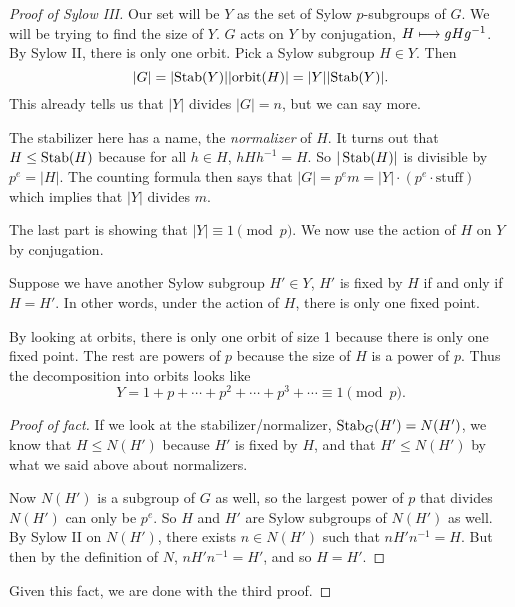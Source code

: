 \begin{proof}[Proof of Sylow III]
    Our set will be $Y$ as the set of Sylow $p$-subgroups of $G$. 
    We will be trying to find the size of $Y$.
    $G$ acts on $Y$ by conjugation, $H \longmapsto gHg^{-1}$.
    By Sylow II, there is only one orbit. 
    Pick a Sylow subgroup $H \in Y$.
    Then $$|G| = \lvert\operatorname{Stab}(Y)\rvert \lvert\text{orbit}(H)\rvert = |Y| \lvert\operatorname{Stab}(Y)\rvert.$$
    This already tells us that $|Y|$ divides $|G| = n$, but we can say more.

    The stabilizer here has a name, the \emph{normalizer} of $H$. 
    It turns out that $H \leq  \operatorname{Stab}(H)$ because for all $h \in H$, $hHh^{-1} = H$. 
    So $|\operatorname{Stab}(H)|$ is divisible by $p^e = |H|$. 
    The counting formula then says that $|G| = p^em = |Y| \cdot (p^e \cdot \text{stuff})$ which implies that $|Y|$ divides $m$.

    The last part is showing that $|Y| \equiv 1 \pmod{p}$. 
    We now use the action of $H$ on $Y$ by conjugation. 
    \begin{fact}
        Suppose we have another Sylow subgroup $H' \in Y$, $H'$ is fixed by $H$ if and only if $H = H'$. 
        In other words, under the action of $H$, there is only one fixed point.
    \end{fact}
    By looking at orbits, there is only one orbit of size 1 because there is only one fixed point. 
    The rest are powers of $p$ because the size of $H$ is a power of $p$.
    Thus the decomposition into orbits looks like \[ Y = 1 + p + \cdots + p^2 + \cdots + p^3 + \cdots \equiv 1 \pmod{p}.\]

    \begin{proof}[Proof of fact]
        If we look at the stabilizer/normalizer, $\operatorname{Stab}_G(H') = N(H')$, we know that $H \leq N(H')$ because $H'$ is fixed by $H$, and that $H' \leq N(H')$ by what we said above about normalizers. 
        
        Now $N(H')$ is a subgroup of $G$ as well, so the largest power of $p$ that divides $N(H')$ can only be $p^e$. 
        So $H$ and $H'$ are Sylow subgroups of $N(H')$ as well.
        By Sylow II on $N(H')$, there exists $n \in N(H')$ such that $nH'n^{-1} = H$. 
        But then by the definition of $N$, $nH' n^{-1} = H'$, and so $H = H'$. 
    \end{proof}
    
    Given this fact, we are done with the third proof.
\end{proof}

\newpage